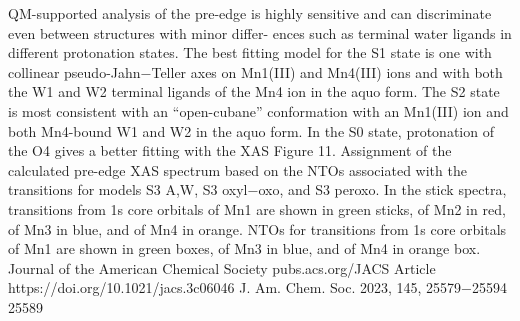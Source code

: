 \documentclass{article}
\begin{document}
QM-supported analysis of the pre-edge is highly sensitive and
can discriminate even between structures with minor differ-
ences such as terminal water ligands in different protonation
states. The best fitting model for the S1 state is one with
collinear pseudo-Jahn−Teller axes on Mn1(III) and Mn4(III)
ions and with both the W1 and W2 terminal ligands of the
Mn4 ion in the aquo form. The S2 state is most consistent with
an “open-cubane” conformation with an Mn1(III) ion and
both Mn4-bound W1 and W2 in the aquo form. In the S0 state,
protonation of the O4 gives a better fitting with the XAS
Figure 11. Assignment of the calculated pre-edge XAS spectrum based on the NTOs associated with the transitions for models S3
A,W, S3
oxyl−oxo, and
S3
peroxo. In the stick spectra, transitions from 1s core orbitals of Mn1 are shown in green sticks, of Mn2 in red, of Mn3 in blue, and of Mn4 in
orange. NTOs for transitions from 1s core orbitals of Mn1 are shown in green boxes, of Mn3 in blue, and of Mn4 in orange box.
Journal of the American Chemical Society
pubs.acs.org/JACS
Article
https://doi.org/10.1021/jacs.3c06046
J. Am. Chem. Soc. 2023, 145, 25579−25594
25589
\end{document}

